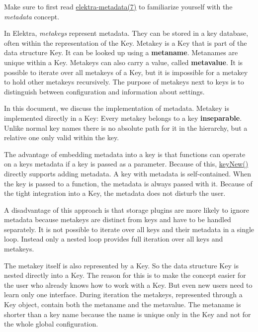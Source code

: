 Make sure to first read \mbox{\hyperlink{doc_help_elektra-metadata_md}{elektra-\/metadata(7)}} to familiarize yourself with the {\itshape metadata} concept.

In Elektra, {\itshape metakeys} represent metadata. They can be stored in a key database, often within the representation of the {\ttfamily Key}. Metakey is a {\ttfamily Key} that is part of the data structure {\ttfamily Key}. It can be looked up using a {\bfseries{metaname}}. Metanames are unique within a {\ttfamily Key}. Metakeys can also carry a value, called {\bfseries{metavalue}}. It is possible to iterate over all metakeys of a {\ttfamily Key}, but it is impossible for a metakey to hold other metakeys recursively. The purpose of metakeys next to keys is to distinguish between configuration and information about settings.

In this document, we discuss the implementation of metadata. Metakey is implemented directly in a {\ttfamily Key}\+: Every metakey belongs to a key {\bfseries{inseparable}}. Unlike normal key names there is no absolute path for it in the hierarchy, but a relative one only valid within the key.

The advantage of embedding metadata into a key is that functions can operate on a key\textquotesingle{}s metadata if a key is passed as a parameter. Because of this, {\ttfamily \mbox{\hyperlink{group__key_gad23c65b44bf48d773759e1f9a4d43b89}{key\+New()}}} directly supports adding metadata. A key with metadata is self-\/contained. When the key is passed to a function, the metadata is always passed with it. Because of the tight integration into a {\ttfamily Key}, the metadata does not disturb the user.

A disadvantage of this approach is that storage plugins are more likely to ignore metadata because metakeys are distinct from keys and have to be handled separately. It is not possible to iterate over all keys and their metadata in a single loop. Instead only a nested loop provides full iteration over all keys and metakeys.

The metakey itself is also represented by a {\ttfamily Key}. So the data structure {\ttfamily Key} is nested directly into a {\ttfamily Key}. The reason for this is to make the concept easier for the user who already knows how to work with a {\ttfamily Key}. But even new users need to learn only one interface. During iteration the metakeys, represented through a {\ttfamily Key} object, contain both the metaname and the metavalue. The metaname is shorter than a key name because the name is unique only in the {\ttfamily Key} and not for the whole global configuration.

